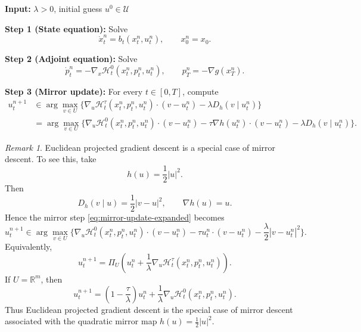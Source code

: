 \documentclass[11pt]{amsart}
\theoremstyle{plain}
\theoremstyle{definition}
\theoremstyle{remark}
\newtheorem*{remark}{Remark}
\begin{document}
\begin{algorithm}[H]
\caption{Mirror Descent Algorithm for Optimal Control}
\label{alg:mirror-pmp}
\begin{algorithmic}[1]

\STATE \textbf{Input:} $\lambda > 0$, initial guess $u^0 \in \mathcal U$


    \STATE \textbf{Step 1 (State equation):} Solve
    \[
    \dot x_t^n = b_t(x_t^n,u_t^n),
    \qquad x_0^n = x_0.
    \]

    \STATE \textbf{Step 2 (Adjoint equation):} Solve
    \[
    \dot p_t^n = -\nabla_x \mathcal H_t^0(x_t^n,p_t^n,u_t^n),
    \qquad
    p_T^n = - \nabla g(x_T^n).
    \]

    \STATE \textbf{Step 3 (Mirror update):} For every $t \in [0,T]$, compute
    \begin{align}\label{eq:mirror-update}
        u_t^{n+1}
    & \in
    \arg\max_{v\in U}
    \Big\{
    \nabla_u \mathcal H_t^\tau(x_t^n,p_t^n,u_t^n)\cdot (v-u_t^n)
    -
    \lambda D_h(v\mid u_t^n)
    \Big\} \\
    & \label{eq:mirror-update-expanded}
    =
    \arg\max_{v\in U}
    \Big\{
    \nabla_u \mathcal H_t^0(x_t^n,p_t^n,u_t^n)\cdot (v-u_t^n)
    -
    \tau \nabla h(u_t^n)\cdot (v-u_t^n)
    -
    \lambda D_h(v\mid u_t^n)
    \Big\}.
    \end{align}

\ENDFOR

\end{algorithmic}
\end{algorithm}

\begin{remark}
   Euclidean projected gradient descent is a special case of mirror descent. To see this, take
\[
h(u)=\frac12 |u|^2.
\]
Then
\[
D_h(v\mid u)=\frac12|v-u|^2,
\qquad
\nabla h(u)=u.
\]
Hence the mirror step \eqref{eq:mirror-update-expanded} becomes
\begin{equation}\label{eq:euclidean-prox}
u_t^{n+1}
\in
\arg\max_{v\in U}
\Big\{
\nabla_u \mathcal H_t^0(x_t^n,p_t^n,u_t^n)\cdot (v-u_t^n)
-
\tau u_t^n\cdot (v-u_t^n)
-
\frac{\lambda}{2}|v-u_t^n|^2
\Big\}.
\end{equation}
Equivalently,
\begin{equation}\label{eq:proj-gradient}
u_t^{n+1}
=
\Pi_U\left(
u_t^n + \frac{1}{\lambda}\nabla_u \mathcal H_t^\tau(x_t^n,p_t^n,u_t^n)
\right).
\end{equation}
If $U=\mathbb R^m$, then
\begin{equation}\label{eq:plain-gradient}
u_t^{n+1}
=
\left(1-\frac{\tau}{\lambda}\right)u_t^n
+\frac{1}{\lambda}\nabla_u \mathcal H_t^0(x_t^n,p_t^n,u_t^n).
\end{equation}
Thus Euclidean projected gradient descent is the special case of mirror descent associated with the quadratic mirror map $h(u)=\tfrac12|u|^2$.
\end{remark}
\end{document}
